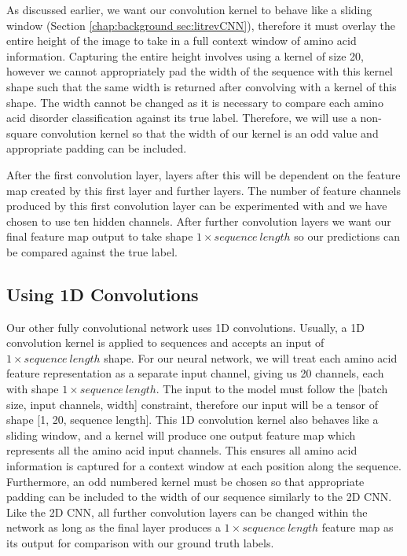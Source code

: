 \documentclass{l4proj}
\begin{document}
As discussed earlier, we want our convolution kernel to behave like a sliding window (Section \ref{chap:background sec:litrevCNN}), therefore it must overlay the entire height of the image to take in a full context window of amino acid information. Capturing the entire height involves using a kernel of size 20, however we cannot appropriately pad the width of the sequence with this kernel shape such that the same width is returned after convolving with a kernel of this shape. The width cannot be changed as it is necessary to compare each amino acid disorder classification against its true label. Therefore, we will use a non-square convolution kernel so that the width of our kernel is an odd value and appropriate padding can be included. 

After the first convolution layer, layers after this will be dependent on the feature map created by this first layer and further layers. The number of feature channels produced by this first convolution layer can be experimented with and we have chosen to use ten hidden channels. After further convolution layers we want our final feature map output to take shape $1\times sequence\ length$ so our predictions can be compared against the true label. 

\subsection*{Using 1D Convolutions}

Our other fully convolutional network uses 1D convolutions. Usually, a 1D convolution kernel is applied to sequences and accepts an input of $1\times sequence\ length$ shape. For our neural network, we will treat each amino acid feature representation as a separate input channel, giving us 20 channels, each with shape $1\times sequence\ length$. The input to the model must follow the [batch size, input channels, width] constraint, therefore our input will be a tensor of shape [1, 20, sequence length]. This 1D convolution kernel also behaves like a sliding window, and a kernel will produce one output feature map which represents all the amino acid input channels. This ensures all amino acid information is captured for a context window at each position along the sequence. Furthermore, an odd numbered kernel must be chosen so that appropriate padding can be included to the width of our sequence similarly to the 2D CNN. Like the 2D CNN, all further convolution layers can be changed within the network as long as the final layer produces a $1\times sequence\ length$ feature map as its output for comparison with our ground truth labels.
\end{document}
